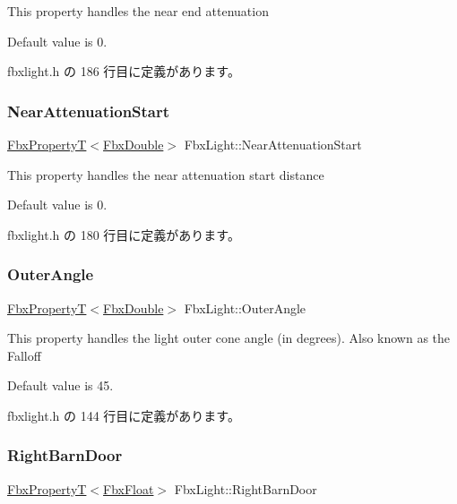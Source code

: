 This property handles the near end attenuation

Default value is 0. 

 fbxlight.\+h の 186 行目に定義があります。

\mbox{\label{class_fbx_light_aaad5d9617b23e08933e5360c948b3d26}} 
\subsubsection{\texorpdfstring{Near\+Attenuation\+Start}{NearAttenuationStart}}
{\footnotesize\ttfamily \hyperlink{class_fbx_property_t}{Fbx\+PropertyT}$<$\hyperlink{fbxtypes_8h_a171e72a1c46fc15c1a6c9c31948c1c5b}{Fbx\+Double}$>$ Fbx\+Light\+::\+Near\+Attenuation\+Start}

This property handles the near attenuation start distance

Default value is 0. 

 fbxlight.\+h の 180 行目に定義があります。

\mbox{\label{class_fbx_light_ae4343cc9ecd82f2fde13d095b067fe68}} 
\subsubsection{\texorpdfstring{Outer\+Angle}{OuterAngle}}
{\footnotesize\ttfamily \hyperlink{class_fbx_property_t}{Fbx\+PropertyT}$<$\hyperlink{fbxtypes_8h_a171e72a1c46fc15c1a6c9c31948c1c5b}{Fbx\+Double}$>$ Fbx\+Light\+::\+Outer\+Angle}

This property handles the light outer cone angle (in degrees). Also known as the Falloff

Default value is 45. 

 fbxlight.\+h の 144 行目に定義があります。

\mbox{\label{class_fbx_light_aea237e743f2b2e2d5a2e3cdf28a78290}} 
\subsubsection{\texorpdfstring{Right\+Barn\+Door}{RightBarnDoor}}
{\footnotesize\ttfamily \hyperlink{class_fbx_property_t}{Fbx\+PropertyT}$<$\hyperlink{fbxtypes_8h_aef968e37f2ddc4188de464d8578c1d5c}{Fbx\+Float}$>$ Fbx\+Light\+::\+Right\+Barn\+Door}

